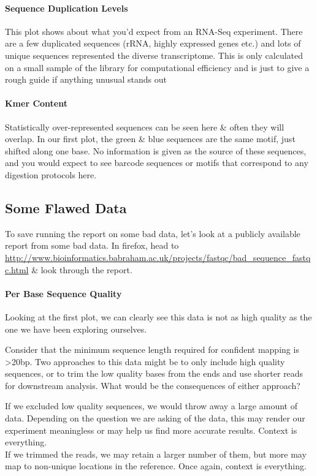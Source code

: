 \paragraph{Sequence Duplication Levels}
This plot shows about what you'd expect from an RNA-Seq experiment.
There are a few duplicated sequences (rRNA, highly expressed genes etc.) and lots of unique sequences represented the diverse transcriptome.
This is only calculated on a small sample of the library for computational efficiency and is just to give a rough guide if anything unusual stands out

\paragraph{Kmer Content}
Statistically over-represented sequences can be seen here \& often they will overlap. 
In our first plot, the green \& blue sequences are the same motif, just shifted along one base.
No information is given as the source of these sequences, and you would expect to see barcode sequences or motifs that correspond to any digestion protocols here.

\subsection{Some Flawed Data}
To save running the report on some bad data, let's look at a publicly available report from some bad data.
In firefox, head to \url{http://www.bioinformatics.babraham.ac.uk/projects/fastqc/bad_sequence_fastqc.html} \& look through the report.

\paragraph{Per Base Sequence Quality}
Looking at the first plot, we can clearly see this data is not as high quality as the one we have been exploring ourselves.

\begin{questions}
Consider that the minimum sequence length required for confident mapping is >20bp.
Two approaches to this data might be to only include high quality sequences, or to trim the low quality bases from the ends and use shorter reads for downstream analysis.
What would be the consequences of either approach? \\
\begin{answer}
If we excluded low quality sequences, we would throw away a large amount of data.
Depending on the question we are asking of the data, this may render our experiment meaningless or may help us find more accurate results.
Context is everything. \\
If we trimmed the reads, we may retain a larger number of them, but more may map to non-unique locations in the reference.
Once again, context is everything.\\
\end{answer}
\end{questions}

